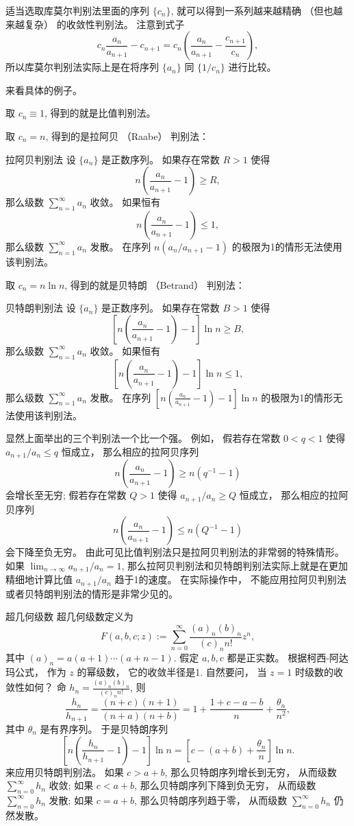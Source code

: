 适当选取库莫尔判别法里面的序列 $\{c_n\}$, 就可以得到一系列越来越精确 （但也越来越复杂） 的收敛性判别法。 注意到式子
$$
c_n\frac{a_n}{a_{n+1}}-c_{n+1}=c_n\left(\frac{a_n}{a_{n+1}}-\frac{c_{n+1}}{c_n}\right),
$$
所以库莫尔判别法实际上是在将序列 $\{a_n\}$ 同 $\{1/c_n\}$ 进行比较。

来看具体的例子。 

取 $c_n\equiv1$, 得到的就是比值判别法。

取 $c_n=n$, 得到的是拉阿贝 （Raabe） 判别法：

\begin{theorem}{拉阿贝判别法}
设 $\{a_n\}$ 是正数序列。 如果存在常数 $R>1$ 使得
$$
n\left(\frac{a_n}{a_{n+1}}-1\right)\geq R,
$$
那么级数 $\sum_{n=1}^\infty a_n$ 收敛。 如果恒有
$$
n\left(\frac{a_n}{a_{n+1}}-1\right)\leq 1,
$$
那么级数 $\sum_{n=1}^\infty a_n$ 发散。 在序列 $n(a_n/a_{n+1}-1)$ 的极限为1的情形无法使用该判别法。
\end{theorem}

取 $c_n=n\ln n$, 得到的就是贝特朗 （Betrand） 判别法：
\begin{theorem}{贝特朗判别法}
设 $\{a_n\}$ 是正数序列。 如果存在常数 $B>1$ 使得
$$
\left[n\left(\frac{a_n}{a_{n+1}}-1\right)-1\right]\ln n\geq B,
$$
那么级数 $\sum_{n=1}^\infty a_n$ 收敛。 如果恒有
$$
\left[n\left(\frac{a_n}{a_{n+1}}-1\right)-1\right]\ln n\leq1,
$$
那么级数 $\sum_{n=1}^\infty a_n$ 发散。 在序列 $\left[n\left(\frac{a_n}{a_{n+1}}-1\right)-1\right]\ln n$ 的极限为1的情形无法使用该判别法。
\end{theorem}

显然上面举出的三个判别法一个比一个强。 例如， 假若存在常数 $0<q<1$ 使得 $a_{n+1}/a_{n}\leq q$ 恒成立， 那么相应的拉阿贝序列
$$
n\left(\frac{a_n}{a_{n+1}}-1\right)\geq n(q^{-1}-1)
$$
会增长至无穷; 假若存在常数 $Q>1$ 使得 $a_{n+1}/a_{n}\geq Q$ 恒成立， 那么相应的拉阿贝序列
$$
n\left(\frac{a_n}{a_{n+1}}-1\right)\leq n(Q^{-1}-1)
$$
会下降至负无穷。 由此可见比值判别法只是拉阿贝判别法的非常弱的特殊情形。 如果 $\lim_{n\to\infty}a_{n+1}/a_{n}=1$, 那么拉阿贝判别法和贝特朗判别法实际上就是在更加精细地计算比值 $a_{n+1}/a_{n}$ 趋于1的速度。 在实际操作中， 不能应用拉阿贝判别法或者贝特朗判别法的情形是非常少见的。

\begin{example}{超几何级数}
超几何级数定义为
$$
F(a,b,c;z):=\sum_{n=0}^\infty\frac{(a)_n(b)_n}{(c)_nn!}z^{n},
$$
其中 $(a)_n=a(a+1)\dotsm(a+n-1)$. 假定 $a,b,c$ 都是正实数。 根据柯西-阿达玛公式， 作为 $z$ 的幂级数， 它的收敛半径是1. 自然要问， 当 $z=1$ 时级数的收敛性如何？ 
命 $h_n=\frac{(a)_n(b)_n}{(c)_nn!}$, 则
$$
\frac{h_n}{h_{n+1}}=\frac{(n+c)(n+1)}{(n+a)(n+b)}
=1+\frac{1+c-a-b}{n}+\frac{\theta_n}{n^2},
$$
其中 $\theta_n$ 是有界序列。 于是贝特朗序列
$$
\left[n\left(\frac{h_n}{h_{n+1}}-1\right)-1\right]\ln n
=\left[c-(a+b)+\frac{\theta_n}{n}\right]\ln n.
$$
来应用贝特朗判别法。 如果 $c>a+b$, 那么贝特朗序列增长到无穷， 从而级数 $\sum_{n=0}^\infty h_n$ 收敛; 如果 $c<a+b$, 那么贝特朗序列下降到负无穷， 从而级数 $\sum_{n=0}^\infty h_n$ 发散; 如果 $c=a+b$, 那么贝特朗序列趋于零， 从而级数 $\sum_{n=0}^\infty h_n$ 仍然发散。
\end{example}